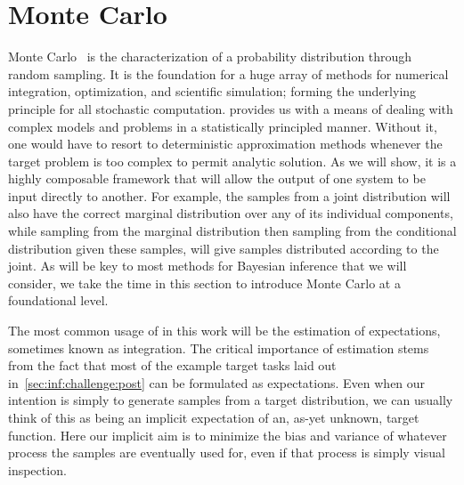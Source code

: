 
\section{Monte Carlo}
\label{sec:inf:mc}

Monte Carlo~\citep{metropolis1949monte} is the characterization of a probability distribution 
through random sampling. It is the foundation for a huge array of methods for numerical 
integration, optimization, and scientific simulation; forming the underlying principle 
for all stochastic computation.
\mc provides us with a means of dealing with complex models and problems in a
statistically principled manner.  Without it, one would have to resort to deterministic
approximation methods whenever the target problem is too complex to permit analytic
solution.  As we will show, it is a highly composable framework that will allow the output
of one system to be input directly to another.  For example, the \mc samples from a joint
distribution will also have the correct marginal distribution over any of its individual components,
while sampling from the marginal distribution then sampling from the conditional distribution
given these samples, will give samples distributed according to the joint.  As \mc
will be key to most methods for Bayesian inference that we will consider, we take the time
in this section to introduce Monte Carlo at a foundational level.

The most common usage of \mc in this work will be the \mc estimation of expectations, 
sometimes known as \mc integration.  
The critical importance of \mc estimation stems from the fact that most of the example
target tasks laid out in~\ref{sec:inf:challenge:post} can be formulated as expectations.
Even when our intention is simply to generate samples from a target distribution, we can
usually think of this as being an implicit expectation of an, as-yet unknown, target function.
Here our implicit aim is to minimize the bias and variance of whatever process the samples are eventually
used for, even if that process is simply visual inspection.  

